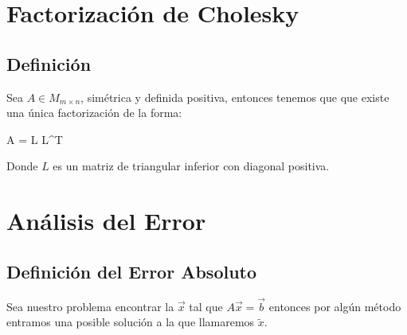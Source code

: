 \documentclass[12pt, fleqn]{report}                             %
\def \Eq {equation}                                             %
\newenvironment{MultiLineEquation*}[1]                          %
        {\begin{\Eq*}\begin{alignedat}{#1}}                         %
        {\end{alignedat}\end{\Eq*}}                                 %
\theoremstyle{break}                                            %
\begin{document}
    \chapter{Factorización de Cholesky}
 
        \clearpage
        \section{Definición}

            Sea $A \in M_{m \times n}$, simétrica y definida positiva, entonces
            tenemos que que existe una única factorización de la forma:
            \begin{MultiLineEquation*}{3}
                A = L L^T
            \end{MultiLineEquation*}

            Donde $L$ es un matriz de triangular inferior con diagonal positiva.



    \chapter{Análisis del Error}


        \clearpage
        \section{Definición del Error Absoluto}

            Sea nuestro problema encontrar la $\vec x$ tal que $A\vec x = \vec b$
            entonces por algún método entramos una posible solución a la que llamaremos
            $\tilde x$.
\end{document}
